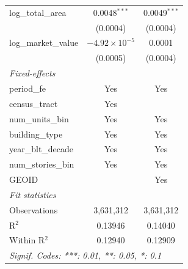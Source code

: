 \begin{tabular}{lcc}
   log\_total\_area                & 0.0048$^{***}$          & 0.0049$^{***}$\\   
                                   & (0.0004)                & (0.0004)\\   
   log\_market\_value              & $-4.92\times 10^{-5}$   & 0.0001\\   
                                   & (0.0005)                & (0.0004)\\   
   \midrule
   \emph{Fixed-effects}\\
   period\_fe                      & Yes                     & Yes\\  
   census\_tract                   & Yes                     & \\  
   num\_units\_bin                 & Yes                     & Yes\\  
   building\_type                  & Yes                     & Yes\\  
   year\_blt\_decade               & Yes                     & Yes\\  
   num\_stories\_bin               & Yes                     & Yes\\  
   GEOID                           &                         & Yes\\  
   \midrule
   \emph{Fit statistics}\\
   Observations                    & 3,631,312               & 3,631,312\\  
   R$^2$                           & 0.13946                 & 0.14040\\  
   Within R$^2$                    & 0.12940                 & 0.12909\\  
   \midrule \midrule
   \multicolumn{3}{l}{\emph{Signif. Codes: ***: 0.01, **: 0.05, *: 0.1}}\\
\end{tabular}
\par\endgroup
\begingroup
\centering
